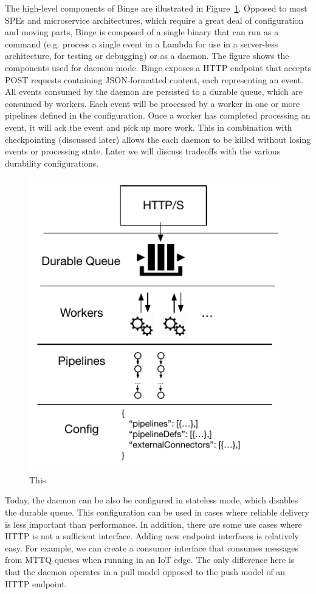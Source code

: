 \documentclass[10pt,twocolumn]{article}
\begin{document}
The high-level components of Binge are illustrated in
Figure~\ref{fig:binge-daemon}.  Opposed to most SPEs and microservice
architectures, which require a great deal of configuration and moving parts,
Binge is composed of a single binary that can run as a  command (e.g.
process a single event in a Lambda for use in a server-less architecture, for
testing or debugging) or as a daemon.  The figure shows the components used for
daemon mode.  Binge exposes a HTTP endpoint that accepts POST requests
containing JSON-formatted content, each representing an event.  All events
consumed by the daemon are persisted to a durable queue, which are consumed by
workers.  Each event will be processed by a worker in one or more pipelines
defined in the configuration.  Once a worker has completed processing an event,
it will ack the event and pick up more work.  This in combination with
checkpointing (discussed later) allows the each daemon to be killed without
losing events or processing state.  Later we will discuss tradeoffs with the
various durability configurations. 

\begin{figure}[h]
\centering
\includegraphics[scale=0.60]{figures/binge-daemon.pdf}
\caption{This}
\label{fig:binge-daemon}
\end{figure}

Today, the daemon can be also be configured in stateless mode, which disables
the durable queue.  This configuration can be used in cases where reliable
delivery is less important than performance.  In addition, there are some use
cases where HTTP is not a sufficient interface.  Adding new endpoint interfaces
is relatively easy.  For example, we can create a consumer interface that
consumes messages from MTTQ queues when running in an IoT edge.  The only
difference here is that the daemon operates in a pull model opposed to the push
model of an HTTP endpoint.
\end{document}
